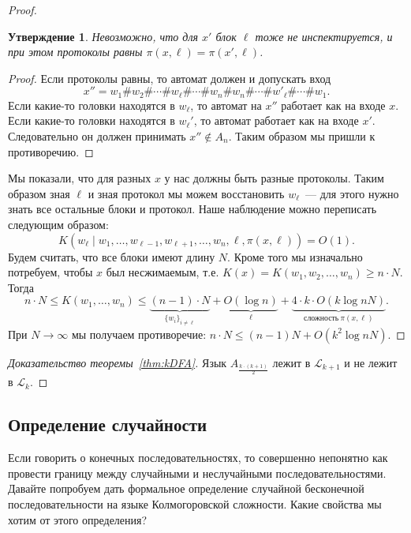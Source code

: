 \documentclass[12pt]{article}
\theoremstyle{definition}
\theoremstyle{plain}
\newtheorem{statement}{Утверждение}[section]
\theoremstyle{remark}
\begin{document}
\begin{proof}
    \begin{statement}
        Невозможно, что для $x'$ блок $\ell$ тоже не инспектируется, 
        и при этом протоколы равны $\pi(x,\ell) = \pi(x',\ell)$.
    \end{statement}
    \begin{proof}
        Если протоколы равны, то автомат должен и допускать вход 
        \[
        x'' = w_1\#w_2\#\dotsb\#w_\ell\#\dotsb\#w_n\#w_n\#\dotsb\#w'_\ell\#\dotsb\#w_1.
        \]                                         
    Если какие-то головки находятся в $w_\ell$, то автомат на $x''$
    работает как на входе $x$. Если какие-то головки находятся в 
    $w_\ell'$, то автомат работает как на входе $x'$. Следовательно он должен
    принимать $x''\not\in A_n$. Таким образом мы пришли к противоречию. 
    \end{proof}
    Мы показали, что для разных $x$ у нас должны быть разные протоколы. Таким
    образом зная $\ell$ и зная протокол мы можем восстановить $w_\ell$~--- для
    этого нужно знать все остальные блоки и протокол.
    Наше наблюдение можно переписать следующим образом:
    \[
        K(w_\ell\mid w_1,\dots,w_{\ell-1},w_{\ell+1},\dotsc,w_n,\ell,\pi(x,\ell)) 
        = O(1).
    \]
    Будем считать, что все блоки имеют длину $N$. Кроме того мы изначально 
    потребуем, чтобы $x$ был несжимаемым, т.е. $K(x) = K(w_1,w_2,\dotsc,w_n)\ge n\cdot N$.
    Тогда
    \[
        n\cdot N \le K(w_1,\dotsc,w_n) \le 
        \underbrace{(n-1)\cdot N}_{\{w_i\}_{i\neq \ell}} + 
        \underbrace{O(\log n)}_{\ell} + 
        \underbrace{4\cdot k\cdot O(k\log nN)}_{\text{сложность}\ \pi(x,\ell)}.
    \]
    При $N\to\infty$ мы получаем противоречие:  $n\cdot N\le (n-1)N + O(k^2\log nN)$.
\end{proof}
\begin{proof}[Доказательство теоремы~\ref{thm:kDFA}]
    Язык $A_{\frac{k\cdot (k + 1)}{2}}$ лежит в $\mathcal L_{k+1}$ 
    и не лежит в $\mathcal L_k$.
\end{proof}

\subsection{Определение случайности}
Если говорить о конечных последовательностях, то совершенно непонятно как 
провести границу между случайными и неслучайными последовательностями. 
Давайте попробуем дать формальное определение
случайной бесконечной последовательности на языке Колмогоровской сложности. Какие свойства
мы хотим от этого определения?
\end{document}
